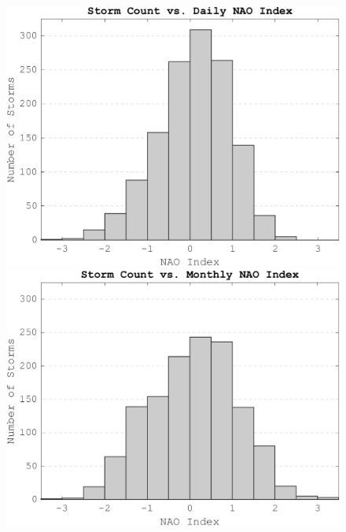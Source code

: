         \begin{figure}[ht]
            \begin{minipage}[t]{0.6\textwidth}
                \includegraphics[width=\textwidth]{figures/Storm Count vs. Daily NAO.png}
                \includegraphics[width=\textwidth]{figures/Storm Count vs. Monthly NAO.png}
            \end{minipage}
            \hfill  %
            \begin{minipage}[t]{0.4\textwidth}
                \vspace*{-215pt}  %

\end{minipage}
\end{figure}

